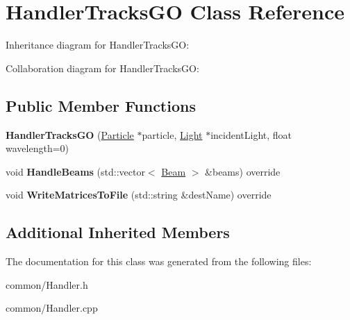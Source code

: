 \hypertarget{class_handler_tracks_g_o}{}\section{Handler\+Tracks\+GO Class Reference}
\label{class_handler_tracks_g_o}


Inheritance diagram for Handler\+Tracks\+GO\+:


Collaboration diagram for Handler\+Tracks\+GO\+:
\subsection*{Public Member Functions}
\begin{DoxyCompactItemize}
\item 
\mbox{\label{class_handler_tracks_g_o_a991b2082b340c3951e8a07dcca7faac7}} 
{\bfseries Handler\+Tracks\+GO} (\mbox{\hyperlink{class_particle}{Particle}} $\ast$particle, \mbox{\hyperlink{class_light}{Light}} $\ast$incident\+Light, float wavelength=0)
\item 
\mbox{\label{class_handler_tracks_g_o_a0968818f112c86548db0f841667dde4f}} 
void {\bfseries Handle\+Beams} (std\+::vector$<$ \mbox{\hyperlink{class_beam}{Beam}} $>$ \&beams) override
\item 
\mbox{\label{class_handler_tracks_g_o_a7a14a10b0d8b54039cf2c9000b0f1d51}} 
void {\bfseries Write\+Matrices\+To\+File} (std\+::string \&dest\+Name) override
\end{DoxyCompactItemize}
\subsection*{Additional Inherited Members}


The documentation for this class was generated from the following files\+:\begin{DoxyCompactItemize}
\item 
common/Handler.\+h\item 
common/Handler.\+cpp\end{DoxyCompactItemize}
